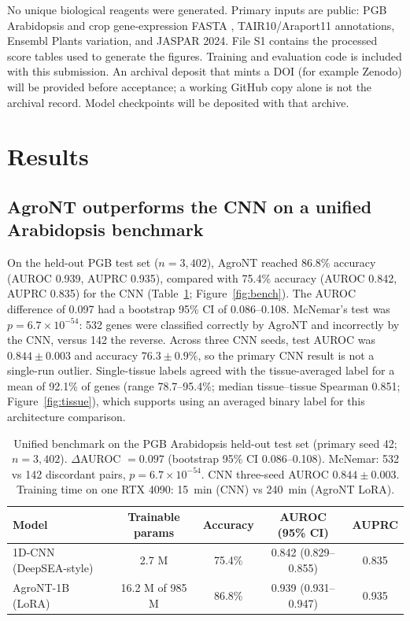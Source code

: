 \documentclass[11pt]{article}
\begin{document}
No unique biological reagents were generated. Primary inputs are public: PGB Arabidopsis and crop gene-expression FASTA \citep{pgb2024}, TAIR10/Araport11 annotations, Ensembl Plants variation, and JASPAR 2024. File S1 contains the processed score tables used to generate the figures. Training and evaluation code is included with this submission. An archival deposit that mints a DOI (for example Zenodo) will be provided before acceptance; a working GitHub copy alone is not the archival record. Model checkpoints will be deposited with that archive.

\section{Results}

\subsection{AgroNT outperforms the CNN on a unified Arabidopsis benchmark}

On the held-out PGB test set ($n = 3{,}402$), AgroNT reached 86.8\% accuracy (AUROC 0.939, AUPRC 0.935), compared with 75.4\% accuracy (AUROC 0.842, AUPRC 0.835) for the CNN (Table~\ref{tab:bench}; Figure~\ref{fig:bench}). The AUROC difference of 0.097 had a bootstrap 95\% CI of 0.086--0.108. McNemar's test was $p = 6.7\times10^{-54}$: 532 genes were classified correctly by AgroNT and incorrectly by the CNN, versus 142 the reverse. Across three CNN seeds, test AUROC was $0.844\pm0.003$ and accuracy $76.3\pm0.9\%$, so the primary CNN result is not a single-run outlier. Single-tissue labels agreed with the tissue-averaged label for a mean of 92.1\% of genes (range 78.7--95.4\%; median tissue--tissue Spearman 0.851; Figure~\ref{fig:tissue}), which supports using an averaged binary label for this architecture comparison.

\begin{table}[htbp]
\centering
\caption{Unified benchmark on the PGB Arabidopsis held-out test set (primary seed 42; $n = 3{,}402$). $\Delta$AUROC $= 0.097$ (bootstrap 95\% CI 0.086--0.108). McNemar: 532 vs 142 discordant pairs, $p = 6.7\times10^{-54}$. CNN three-seed AUROC $0.844\pm0.003$. Training time on one RTX 4090: 15~min (CNN) vs 240~min (AgroNT LoRA).}
\label{tab:bench}
\begin{tabular}{lcccc}
\toprule
Model & Trainable params & Accuracy & AUROC (95\% CI) & AUPRC \\
\midrule
1D-CNN (DeepSEA-style) & 2.7 M & 75.4\% & 0.842 (0.829--0.855) & 0.835 \\
AgroNT-1B (LoRA) & 16.2 M of 985 M & 86.8\% & 0.939 (0.931--0.947) & 0.935 \\
\bottomrule
\end{tabular}
\end{table}
\end{document}
